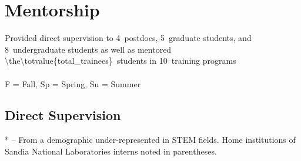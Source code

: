 \documentclass{article}[12pt]
\begin{document}
	\section*{Mentorship}
	
	
	\newcommand{\numTrainingPrograms}{10}
	\newcommand{\numDirectGrad}{5}
	\newcommand{\numDirectUG}{8}
	\newcommand{\numPostdoc}{4}
	\noindent
	Provided direct supervision to \numPostdoc~postdocs,  \numDirectGrad~graduate students, and \numDirectUG~undergraduate students as well as mentored \num{\the\totvalue{total_trainees}}~students in  \numTrainingPrograms~training programs
	\\
	\\
	F = Fall, Sp = Spring, Su = Summer
	
	\subsection*{Direct Supervision}
	
	* --  From a demographic under-represented in STEM fields. Home institutions of Sandia National Laboratories interns noted in parentheses. 
	
	
	
\end{document}
